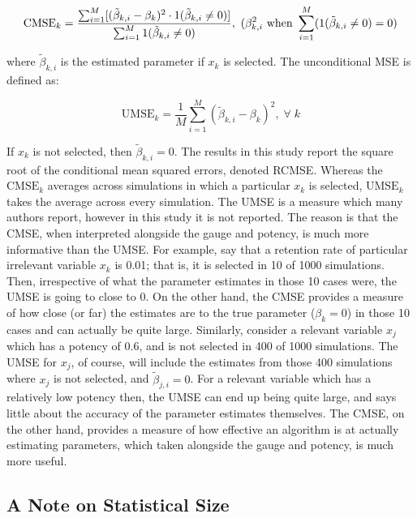 \documentclass[11pt, oneside]{book}   	%
\begin{document}
$$ \textrm{CMSE}_{k} = \frac{\sum_{i=1}^{M}[(\tilde\beta_{k,i} - \beta_{k})^{2} \cdot 1(\tilde\beta_{k,i} \neq 0)]}{\sum_{i=1}^{M}1(\tilde\beta_{k,i} \neq 0)},\-\-\-\-\ (\beta_{k,i}^{2} \textrm{ when  } \sum_{i=1}^{M}(1(\tilde\beta_{k,i} \neq 0)=0)$$

where $\tilde\beta_{k,i}$ is the estimated parameter if $x_{k}$ is selected. The unconditional MSE is defined as:

$$ \textrm{UMSE}_{k} = \frac{1}{M}\sum_{i=1}^{M}(\tilde\beta_{k,i} - \beta_{k})^{2}, \; \forall \; k$$

If $x_{k}$ is not selected, then $\tilde\beta_{k,i} = 0$. The results in this study report the square root of the conditional mean squared errors, denoted RCMSE. Whereas the $\textrm{CMSE}_{k}$ averages across simulations in which a particular $x_{k}$ is selected, $\textrm{UMSE}_{k}$ takes the average across every simulation.  The UMSE is a measure which many authors report, however in this study it is not reported.  The reason is that the CMSE, when interpreted alongside the gauge and potency, is much more informative than the UMSE. For example, say that a retention rate of particular irrelevant variable $x_{k}$ is 0.01; that is, it is selected in 10 of 1000 simulations. Then, irrespective of what the parameter estimates in those 10 cases were, the UMSE is going to close to 0. On the other hand, the CMSE provides a measure of how close (or far) the estimates are to the true parameter ($\beta_{k} = 0$) in those 10 cases and can actually be quite large. Similarly, consider a relevant variable $x_{j}$ which has a potency of 0.6, and is not selected in 400 of 1000 simulations. The UMSE for $x_{j}$, of course, will include the estimates from those 400 simulations where $x_{j}$ is not selected, and $\tilde\beta_{j,i}=0$. For a relevant variable which has a relatively low potency then, the UMSE can end up being quite large, and says little about the accuracy of the parameter estimates themselves. The CMSE, on the other hand, provides a measure of how effective an algorithm is at actually estimating parameters, which taken alongside the gauge and potency, is much more useful.


\subsection{A Note on Statistical Size}
\end{document}

